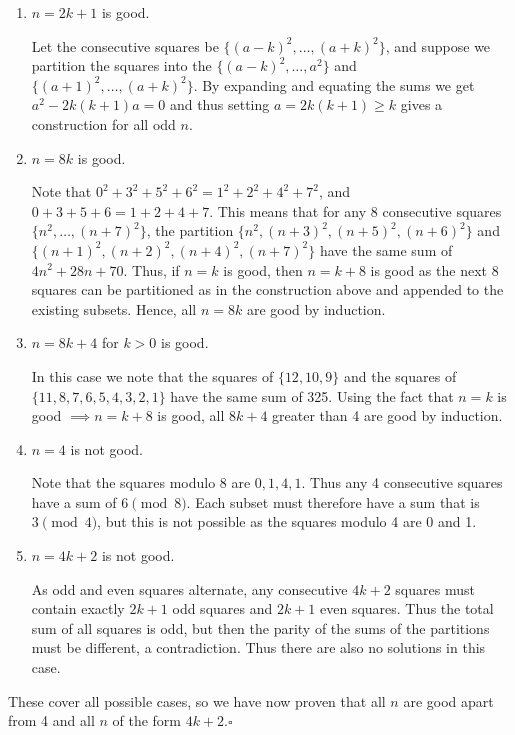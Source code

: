 \documentclass[10pt]{article}
\begin{document}
	\begin{enumerate}
	\item \(n = 2k+1\) is good.
	
	Let the consecutive squares be \(\{(a-k)^2, \dots, (a+k)^2\}\), and suppose we partition the squares into the \(\{(a-k)^2, \dots, a^2\}\) and \(\{(a+1)^2, \dots, (a+k)^2\}\). By expanding and equating the sums we get \(a^2 - 2k(k+1)a = 0\) and thus setting \(a = 2k(k+1) \geq k\) gives a construction for all odd \(n\).
		
	\item \(n = 8k\) is good.
	
	Note that \(0^2 + 3^2 + 5^2 + 6^2 = 1^2 + 2^2 + 4^2 + 7^2\), and \(0 + 3 + 5 + 6 = 1 + 2 + 4 + 7\). This means that for any 8 consecutive squares \(\{n^2, \dots, (n+7)^2\}\), the partition \(\{n^2, (n+3)^2, (n+5)^2, (n+6)^2\}\) and \(\{(n+1)^2, (n+2)^2, (n+4)^2, (n+7)^2\}\) have the same sum of \(4n^2 + 28n + 70\). Thus, if \(n = k\) is good, then \(n= k+8\) is good as the next 8 squares can be partitioned as in the construction above and appended to the existing subsets. Hence, all \(n = 8k\) are good by induction.
	
	\item \(n = 8k+4\) for \(k > 0\) is good.
	
	In this case we note that the squares of \(\{12, 10, 9\}\) and the squares of \(\{11, 8, 7, 6, 5, 4, 3, 2, 1\}\) have the same sum of 325. Using the fact that \(n = k\) is good \(\implies n = k+8\) is good, all \(8k + 4\) greater than 4 are good by induction.
	
	\item \(n = 4\) is not good.
	
	Note that the squares modulo 8 are \(0, 1, 4, 1\). Thus any 4 consecutive squares have a sum of \(6 \pmod 8\). Each subset must therefore have a sum that is \(3 \pmod 4\), but this is not possible as the squares modulo 4 are 0 and 1.
	
	\item \(n = 4k+2\) is not good.
	
	As odd and even squares alternate, any consecutive \(4k+2\) squares must contain exactly \(2k+1\) odd squares and \(2k+1\) even squares. Thus the total sum of all squares is odd, but then the parity of the sums of the partitions must be different, a contradiction. Thus there are also no solutions in this case.
	\end{enumerate}
	
	\noindent These cover all possible cases, so we have now proven that all \(n\) are good apart from 4 and all \(n\) of the form \(4k+2\).\hfill\ensuremath{\square}\\
	
\end{document}
